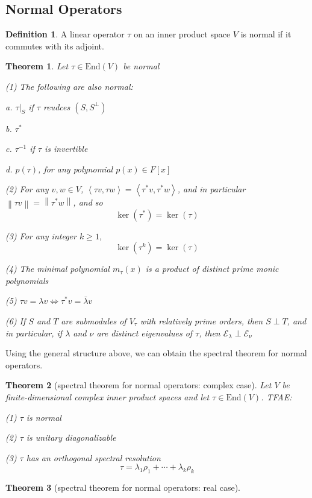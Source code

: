 \documentclass{book}
\newtheorem{theorem}{Theorem}[section]
\theoremstyle{definition}
\newtheorem{definition}{Definition}[section]
\begin{document}
\subsection{Normal Operators}
\begin{definition}
A linear operator $\tau$ on an inner product space $V$ is normal if it commutes with its adjoint.
\end{definition}
\begin{theorem}
Let $\tau\in \text{End}(V)$ be normal \par
(1) The following are also normal:\par

\quad a. $\tau|_S$ if $\tau$ reudces $(S,S^\perp)$\par
\quad b. $\tau^*$\par
\quad c. $\tau^{-1}$ if $\tau$ is invertible\par
\quad d. $p(\tau)$, for any polynomial $p(x)\in F[x]$\par

(2) For any $v,w\in V$, $\left \langle \tau v,\tau w \right \rangle =\left \langle \tau^* v,\tau^* w \right \rangle $, and in particular $\left \| \tau v \right \| =\left \| \tau^* w \right \| $, and so \[\ker(\tau^*)=\ker(\tau)\]\par
(3) For any integer $k\ge 1$, \[\ker(\tau^k)=\ker(\tau)\]\par
(4) The minimal polynomial $m_\tau(x)$ is a product of distinct prime monic polynomials\par
(5) $\tau v=\lambda v\Longleftrightarrow \tau^*v=\bar{\lambda}v$ \par
(6) If $S$ and $T$ are submodules of $V_\tau$ with relatively prime orders, then $S\perp T$, and in particular, if $\lambda$ and $\nu$ are distinct eigenvalues of $\tau$, then $\mathcal{E}_\lambda\perp \mathcal{E}_\nu$
\end{theorem}
Using the general structure above, we can obtain the spectral theorem for normal operators.
\begin{theorem}[spectral theorem for normal operators: complex case]
Let $V$ be finite-dimensional complex inner product spaces and let $\tau\in \text{End}(V)$. TFAE:\par
(1) $\tau$ is normal\par
(2) $\tau$ is unitary diagonalizable\par
(3) $\tau$ has an orthogonal spectral resolution \[\tau=\lambda_1\rho_1+\cdots+\lambda_k\rho_k\]
\end{theorem}
\begin{theorem}[spectral theorem for normal operators: real case]

\end{theorem}
\end{document}
